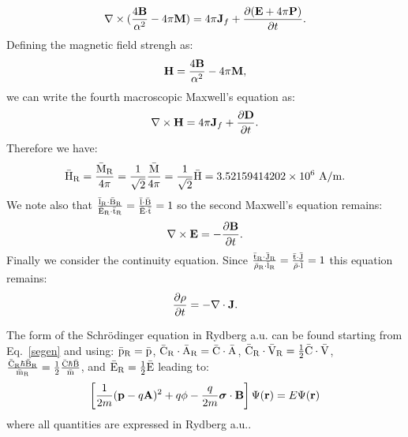 \documentclass[12pt,a4paper,twoside]{report}
\def\barhry{3.52159414202\times 10^{6}}
\begin{document}
{{\begin{equation}
\nabla \times ({4{\bf B} \over \alpha^2}-4 \pi {\bf M})= 4 \pi 
{\bf J}_f + {\partial ({\bf E}+4\pi {\bf P}) \over \partial t}.
\end{equation}
Defining the magnetic field strengh as:
\begin{equation}
{\bf H}={4{\bf B} \over \alpha^2}-4 \pi {\bf M},
\end{equation}
we can write the fourth macroscopic Maxwell's equation as:
\begin{equation}
\nabla \times {\bf H}= 4 \pi 
{\bf J}_f + {\partial {\bf D} \over \partial t}.
\end{equation}
Therefore we have:
\begin{equation}
{\rm \bar H_R} ={{\rm \bar M_R} \over 4 \pi}={1\over \sqrt{2}} {{\rm \bar M} \over 4 \pi}=
{1\over \sqrt{2}} {\rm \bar H}=\barhry\ {\rm A}/{\rm m}.
\end{equation}
We note also that ${{\rm \bar l_R}\cdot {\rm \bar B_R} \over {\rm \bar E_R}\cdot {\rm \bar t_R}}=
{{\rm \bar l}\cdot {\rm \bar B} \over {\rm \bar E}\cdot {\rm \bar t}}=1$ so the second Maxwell's equation
remains:
\begin{equation}
\nabla \times {\bf E}=-{\partial {\bf B} \over \partial t}.
\end{equation}
Finally we consider the continuity equation. Since
${{\rm \bar t_R}\cdot {\rm \bar J_R} \over {\rm \bar \rho_R}\cdot {\rm \bar l_R}}={{\rm \bar t}\cdot {\rm \bar J} 
\over {\rm \bar \rho}\cdot {\rm \bar l}}=1$ this equation remains:
\begin{equation}
{\partial \rho \over \partial t}=-\nabla \cdot {\bf J}.
\end{equation}

The form of the Schr\"odinger equation in Rydberg a.u.
can be found starting from Eq.~\ref{segen} and using:
${\rm \bar p_R}={\rm \bar p}$, ${\rm \bar C_R}\cdot {\rm \bar A_R}= 
{\rm \bar C}\cdot {\rm \bar A}$,
${\rm \bar C_R}\cdot {\rm \bar V_R}= {1\over 2} {\rm \bar C}\cdot
{\rm \bar V}$,  
${{\rm \bar C_R} \hbar {\rm \bar B_R} \over {\rm \bar m_R}}
= {1\over 2} {{\rm \bar C} \hbar {\rm \bar B} \over {\rm \bar m}}$,
and ${\rm \bar E_R}={1\over 2} {\rm \bar E}$ leading to:
\begin{equation}
\left[{1\over 2m} ({\bf p}- q {\bf A})^2 + 
q \phi - 
{q \over 2 m} 
{\boldsymbol \sigma} \cdot {\bf B} \right]
\Psi({\bf r})= E \Psi({\bf r})
\end{equation}
where all quantities are expressed in Rydberg a.u.. \\

}}
\end{document}
